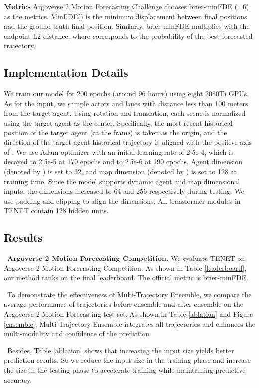\documentclass[10pt,twocolumn,letterpaper]{article}
\begin{document}
\noindent\textbf{Metrics} Argoverse 2 Motion Forecasting Challenge chooses brier-minFDE (=6) as the metrics. MinFDE() is the minimum displacement between  final positions and the ground truth final position. Similarly, brier-minFDE multiplies  with the endpoint L2 distance, where  corresponds to the probability of the best forecasted trajectory.

\subsection{Implementation Details}
We train our model for 200 epochs (around 96 hours) using eight 2080Ti GPUs. As for the input, we sample actors and lanes with distance less than 100 meters from the target agent. Using rotation and translation, each scene is normalized using the target agent as the center. Specifically, the most recent historical position of the target agent (at the  frame) is taken as the origin, and the direction of the target agent historical trajectory is aligned with the positive axis of . We use Adam \cite{kingma2014adam} optimizer with an initial learning rate of 2.5e-4, which is decayed to 2.5e-5 at 170 epochs and to 2.5e-6 at 190 epochs. Agent dimension (denoted by ) is set to 32, and map dimension (denoted by ) is set to 128 at training time. Since the model supports dynamic agent and map dimensional inputs, the dimensions increased to 64 and 256 respectively during testing. We use padding and clipping to align the dimensions. All transformer modules in TENET contain 128 hidden units.


    
\subsection{Results}
    \ \textbf{Argoverse 2 Motion Forecasting Competition.} We evaluate TENET on Argoverse 2 Motion Forecasting Competition. As shown in Table \ref{leaderboard}, our method ranks  on the final leaderboard. The official metric is brier-minFDE. 
    
    \ To demonstrate the effectiveness of Multi-Trajectory Ensemble, we compare the average performance of trajectories before ensemble and after ensemble on the Argoverse 2 Motion Forecasting test set. As shown in Table \ref{ablation} and Figure \ref{ensemble}, Multi-Trajectory Ensemble integrates all trajectories and enhances the multi-modality and confidence of the prediction.  
    
    \ Besides, Table \ref{ablation} shows that increasing the input size yields better prediction results. So we reduce the input size in the training phase and increase the size in the testing phase to accelerate training while maintaining predictive accuracy.
    
\end{document}

